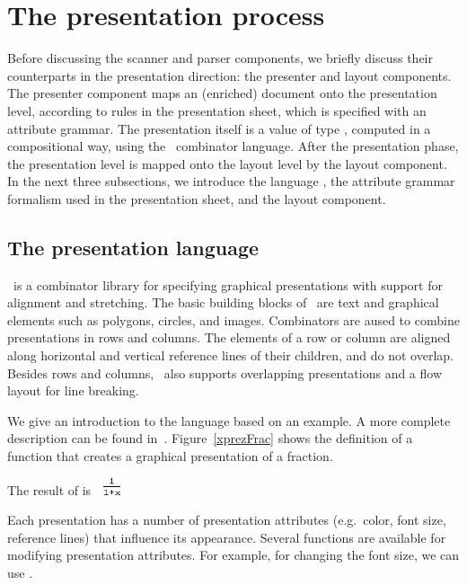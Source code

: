 \documentclass[12pt]{article}
\begin{document}
%
\section{The presentation process}\label{sect:presentationProcess}
%

Before discussing the scanner and parser components, we briefly discuss their counterparts in the presentation direction: the presenter and layout components. The presenter component maps an (enriched) document onto the presentation level, according to rules in the presentation sheet, which is specified with an attribute grammar. The presentation itself is a value of type , computed in a compositional way, using the\  combinator language. After the presentation phase, the presentation level is mapped onto the layout level by the layout component. In the next three subsections, we introduce the language \Xprez, the attribute grammar formalism used in the presentation sheet, and the layout component.

\subsection{The {\Xprez} presentation language} \label{sect:xprez}

\Xprez\ is a combinator library for specifying graphical presentations with support for alignment and stretching.  The basic building blocks of \Xprez\ are text and graphical elements such as polygons, circles, and images. Combinators are aused to combine presentations in rows and columns. The elements of a row or column are aligned along horizontal and vertical reference lines of their children, and do not overlap. Besides rows and columns, \Xprez\ also supports overlapping presentations and a flow layout for line breaking.

We give an introduction to the language based on an example. A more complete description can be found in~\cite{schrage04Proxima}. Figure~\ref{xprezFrac} shows the definition of a function  that creates a graphical presentation of a fraction. 

The result of  is~~\includegraphics[width=0.5cm]{images/fracExample} 

\bc
Each presentation has a number of presentation attributes (e.g.\ color, font size, reference lines) that influence its appearance. Several functions are available for modifying presentation attributes. For example, for changing the font size, we can use . 
\ec
\end{document}
